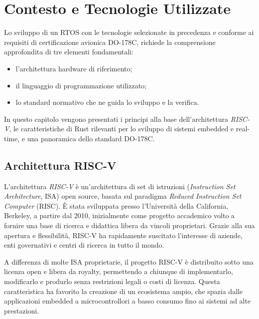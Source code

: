 \documentclass[italian, Lau, oneside]{sapthesis} %
\begin{document}
\chapter*{Contesto e Tecnologie Utilizzate}
\label{cap:1}

Lo sviluppo di un RTOS con le tecnologie selezionate in precedenza e conforme ai requisiti di certificazione avionica DO-178C, richiede la comprensione approfondita di tre elementi fondamentali:
\begin{itemize}
    \item l’architettura hardware di riferimento;
    \item il linguaggio di programmazione utilizzato;
    \item lo standard normativo che ne guida lo sviluppo e la verifica.
\end{itemize}  
In questo capitolo vengono presentati i principi alla base dell’architettura \textit{RISC-V}, le caratteristiche di Rust rilevanti per lo sviluppo di sistemi embedded e real-time, e una panoramica dello standard DO-178C.

\section{Architettura RISC-V}

L'architettura \textit{RISC-V} è un'architettura di set di istruzioni (\textit{Instruction Set Architecture}, ISA) open source, basata sul paradigma \textit{Reduced Instruction Set Computer} (RISC).  
È stata sviluppata presso l'Università della California, Berkeley, a partire dal 2010, inizialmente come progetto accademico volto a fornire una base di ricerca e didattica libera da vincoli proprietari.  
Grazie alla sua apertura e flessibilità, RISC-V ha rapidamente suscitato l'interesse di aziende, enti governativi e centri di ricerca in tutto il mondo.

A differenza di molte ISA proprietarie, il progetto RISC-V è distribuito sotto una licenza open e libera da royalty, permettendo a chiunque di implementarlo, modificarlo e produrlo senza restrizioni legali o costi di licenza. Questa caratteristica ha favorito la creazione di un ecosistema ampio, che spazia dalle applicazioni embedded a microcontrollori a basso consumo fino ai sistemi ad alte prestazioni.
\end{document}

